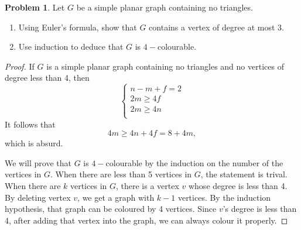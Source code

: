 \documentclass[a4paper,11pt]{article}%
\theoremstyle{remark}
\theoremstyle{definition}
\newtheorem{problem}{Problem}[subsection]
\begin{document}
\begin{problem}
    Let $G$ be a simple planar graph containing no triangles.
    \begin{enumerate}
        \item Using Euler's formula, show that $G$ contains a vertex of degree at most 3.
        \item Use induction to deduce that $G$ is $4-$colourable.
    \end{enumerate}
    \begin{proof}
        If $G$ is a simple planar graph containing no triangles and no vertices of degree less than 4, 
        then 
    \[\begin{cases}
        n-m+f=2\\
        2m\geq 4f\\
        2m\geq 4n\\
    \end{cases}\]
    It follows that 
    \[4m\geq 4n+4f=8+4m,\]
    which is absurd.

    We will prove that $G$ is $4-$colourable by the induction on the number of the vertices in $G$.
    When there are less than 5 vertices in $G$, the statement is trival.
    When there are $k$ vertices in $G$, there is a vertex $v$ whose degree is less than 4.
    By deleting vertex $v$, we get a graph with $k-1$ vertices. By the induction hypothesis, that graph 
    can be coloured by 4 vertices. Since $v$'s degree is less than 4, after adding that vertex into the graph,  
    we can always colour it properly.
    \end{proof}
\end{problem}
\end{document}
